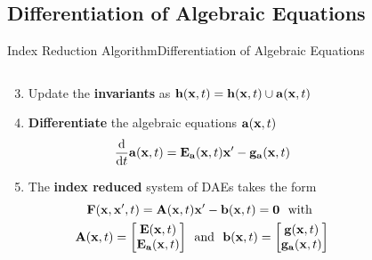 \subsection{Differentiation of Algebraic Equations}

\begin{frame}{Index Reduction Algorithm}{Differentiation of Algebraic Equations}
  \vspace{-1.5em}
  \begin{columns}
    \begin{column}[c]{0.6\textwidth}
      \begin{enumerate}[<+->]\setcounter{enumi}{2}
        \item Update the \textbf{invariants} as $\mathbf{h}(\mathbf{x}, t) = \mathbf{h}(\mathbf{x}, t) \cup \mathbf{a}(\mathbf{x}, t)$
        \item \textbf{Differentiate} the algebraic equations $\mathbf{a}(\mathbf{x}, t)$
        \begin{equation*}
          \dfrac{\text{d}}{\text{d}t} \mathbf{a}(\mathbf{x}, t) = \mathbf{E}_{\mathbf{a}}(\mathbf{x}, t) \mathbf{x}^\prime - \mathbf{g}_{\mathbf{a}}(\mathbf{x}, t)
        \end{equation*}
        \item The \textbf{index reduced} system of \acsp{DAE} takes the form
        \begin{align*}
          \mathbf{F}(\mathbf{x}, \mathbf{x}^\prime, t) = \mathbf{A}(\mathbf{x}, t) &\mathbf{x}^\prime - \mathbf{b}(\mathbf{x}, t) = \mathbf{0} ~~ \text{with} \\
          \mathbf{A}(\mathbf{x}, t) = \begin{bmatrix} \mathbf{E}(\mathbf{x}, t) \\ \mathbf{E}_{\mathbf{a}}(\mathbf{x}, t) \end{bmatrix}
          ~~ &\text{and} ~~
          \mathbf{b}(\mathbf{x}, t) = \begin{bmatrix} \mathbf{g}(\mathbf{x}, t) \\ \mathbf{g}_{\mathbf{a}}(\mathbf{x}, t) \end{bmatrix}
        \end{align*}
      \end{enumerate}
    \end{column}
    \begin{column}[c]{0.4\textwidth}
    \end{column}
  \end{columns}
\end{frame}

